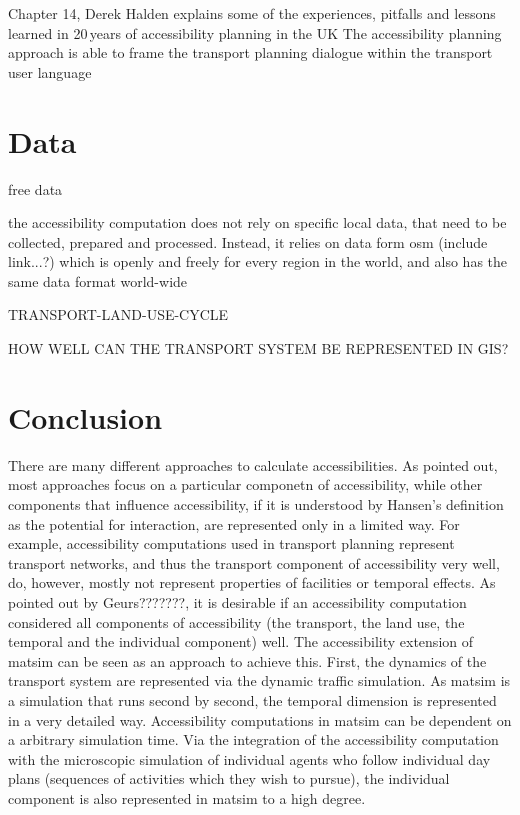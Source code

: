 Chapter 14, Derek Halden explains some of the experiences, pitfalls and lessons learned in 20\,years of accessibility 
planning in the UK The accessibility planning approach is able to frame the transport planning dialogue within 
the transport user language 


\section{Data}
free data

the accessibility computation does not rely on specific local data, that need to be collected, prepared and processed. 
Instead, it relies on data form \gls{osm} (include link...?) which is openly and freely for every region in the world, 
and also has the same data format world-wide


TRANSPORT-LAND-USE-CYCLE

HOW WELL CAN THE TRANSPORT SYSTEM BE REPRESENTED IN GIS?




\section{Conclusion}
There are many different approaches to calculate accessibilities. As pointed out, most approaches focus on a particular 
componetn of accessibility, while other components that influence accessibility, if it is understood by Hansen's definition 
as the potential for interaction, are represented only in a limited way. For example, accessibility computations used in 
transport planning represent transport networks, and thus the transport component of accessibility very well, do, however, 
mostly not represent properties of facilities or temporal effects. As pointed out by Geurs???????, it is desirable if an 
accessibility computation considered all components of accessibility (the transport, the land use, the temporal and the 
individual component) well. The accessibility extension of \gls{matsim} can be seen as an approach to achieve this. First, 
the dynamics of the transport system are represented via the dynamic traffic simulation. As \gls{matsim} is a simulation 
that runs second by second, the temporal dimension is represented in a very detailed way. Accessibility computations in 
\gls{matsim} can be dependent on a arbitrary simulation time. Via the integration of the accessibility computation with 
the microscopic simulation of individual agents who follow individual day plans (sequences of activities which they 
wish to pursue), the individual component is also represented in \gls{matsim} to a high degree.

